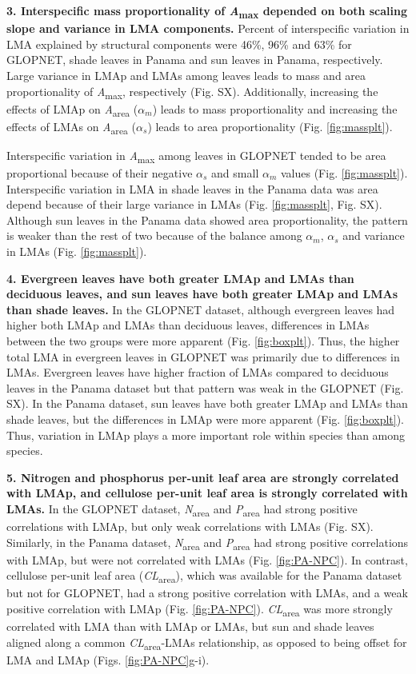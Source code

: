 \documentclass[
  12pt,
]{article}
\begin{document}
\textbf{3. Interspecific mass proportionality of \emph{A}\textsubscript{max} depended on both scaling slope and variance in LMA components.}
Percent of interspecific variation in LMA explained by structural components were 46\%, 96\% and 63\% for GLOPNET, shade leaves in Panama and sun leaves in Panama, respectively.
Large variance in LMAp and LMAs among leaves leads to mass and area proportionality of \emph{A}\textsubscript{max}, respectively (Fig. SX). Additionally, increasing the effects of LMAp on \emph{A}\textsubscript{area} (\(\alpha_m\)) leads to mass proportionality and increasing the effects of LMAs on \emph{A}\textsubscript{area} (\(\alpha_s\)) leads to area proportionality (Fig. \ref{fig:massplt}).

Interspecific variation in \emph{A}\textsubscript{max} among leaves in GLOPNET tended to be area proportional because of their negative \(\alpha_s\) and small \(\alpha_m\) values (Fig. \ref{fig:massplt}).
Interspecific variation in LMA in shade leaves in the Panama data was area depend because of their large variance in LMAs (Fig. \ref{fig:massplt}, Fig. SX).
Although sun leaves in the Panama data showed area proportionality, the
pattern is weaker than the rest of two because of the balance among \(\alpha_m\), \(\alpha_s\) and variance in LMAs (Fig. \ref{fig:massplt}).

\textbf{4. Evergreen leaves have both greater LMAp and LMAs than deciduous leaves, and sun leaves have both greater LMAp and LMAs than shade leaves.}
In the GLOPNET dataset, although evergreen leaves had higher both LMAp and LMAs than deciduous leaves, differences in LMAs between the two groups were more apparent (Fig. \ref{fig:boxplt}).
Thus, the higher total LMA in evergreen leaves in GLOPNET was primarily due to differences in LMAs.
Evergreen leaves have higher fraction of LMAs compared to deciduous leaves in the Panama dataset but that pattern was weak in the GLOPNET (Fig. SX).
In the Panama dataset, sun leaves have both greater LMAp and LMAs than shade leaves, but the differences in LMAp were more apparent (Fig. \ref{fig:boxplt}).
Thus, variation in LMAp plays a more important role within species than among species.

\textbf{5. Nitrogen and phosphorus per-unit leaf area are strongly correlated with LMAp, and cellulose per-unit leaf area is strongly correlated with LMAs.}
In the GLOPNET dataset, \emph{N}\textsubscript{area} and \emph{P}\textsubscript{area} had strong positive correlations with LMAp, but only weak correlations with LMAs (Fig. SX).
Similarly, in the Panama dataset, \emph{N}\textsubscript{area} and \emph{P}\textsubscript{area} had strong positive correlations with LMAp, but were not correlated with LMAs (Fig. \ref{fig:PA-NPC}).
In contrast, cellulose per-unit leaf area (\emph{CL}\textsubscript{area}), which was available for the Panama dataset but not for GLOPNET, had a strong positive correlation with LMAs, and a weak positive correlation with LMAp (Fig. \ref{fig:PA-NPC}).
\emph{CL}\textsubscript{area} was more strongly correlated with LMA than with LMAp or LMAs, but sun and shade leaves aligned along a common \emph{CL}\textsubscript{area}-LMAs relationship, as opposed to being offset for LMA and LMAp (Figs. \ref{fig:PA-NPC}g-i).
\end{document}
